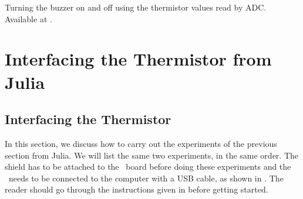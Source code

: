 \begin{pycode}
  {Turning the buzzer on and off using the thermistor values read by
    ADC.  Available at .}
  \label{py:therm-buzzer}
  
\end{pycode}

\section{Interfacing the Thermistor from Julia}
\subsection{Interfacing the Thermistor}
In this section, we discuss how to carry out the experiments of the
previous section from Julia.  We will list the same two experiments,
in the same order.  The shield has to be attached to the \arduino\ board
before doing these experiments and the \arduino\ needs to be connected to the computer
with a USB cable, as shown in .
The reader should go through the instructions given in  before getting started.


